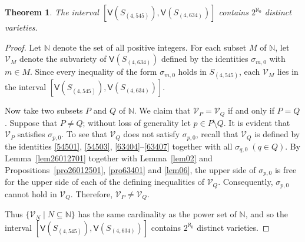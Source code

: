 \documentclass[reqno]{amsart}
\theoremstyle{plain}
\newtheorem{thm}{Theorem}[section]
\theoremstyle{definition}
\begin{document}
\begin{thm}\label{thm01}
The interval $[\mathsf{V}(S_{(4, 545)}), \mathsf{V}(S_{(4, 634)})]$ contains $2^{\aleph_0}$ distinct varieties.
\end{thm}
\begin{proof}
Let $\mathbb{N}$ denote the set of all positive integers.
For each subset $M$ of $\mathbb{N}$,
let $\mathcal{V}_M$ denote the subvariety of $\mathsf{V}(S_{(4, 634)})$
defined by the identities $\sigma_{m, 0}$ with $m\in M$.
Since every inequality of the form $\sigma_{m, 0}$ holds in $S_{(4, 545)}$,
each $\mathcal{V}_M$ lies in the interval $[\mathsf{V}(S_{(4, 545)}), \mathsf{V}(S_{(4, 634)})]$.

Now take two subsets $P$ and $Q$ of $\mathbb{N}$.
We claim that $\mathcal{V}_P=\mathcal{V}_Q$ if and only if $P=Q$.
Suppose that $P\neq Q$; without loss of generality let $p \in P \setminus Q$.
It is evident that $\mathcal{V}_P$ satisfies $\sigma_{p, 0}$.
To see that $\mathcal{V}_Q$ does not satisfy $\sigma_{p,0}$, recall that $\mathcal{V}_Q$ is defined by
the identities \eqref{54501}, \eqref{54503}, \eqref{63404}--\eqref{63407} together with
all $\sigma_{q,0}\;(q \in Q)$.
By Lemma~\ref{lem26012701} together with Lemma~\ref{lem02} and
Propositions~\ref{pro26012501}, \ref{pro63401} and \ref{lem06},
the upper side of $\sigma_{p,0}$
is free for the upper side of each of the defining inequalities of $\mathcal{V}_Q$.
Consequently, $\sigma_{p,0}$ cannot hold in $\mathcal{V}_Q$.
Therefore, $\mathcal{V}_P \neq \mathcal{V}_Q$.

Thus $\{\mathcal{V}_N \mid N\subseteq \mathbb{N}\}$ has the same cardinality as the power set of $\mathbb{N}$, and so
the interval $[\mathsf{V}(S_{(4, 545)}), \mathsf{V}(S_{(4, 634)})]$ contains $2^{\aleph_0}$ distinct varieties.
\end{proof}
\end{document}
